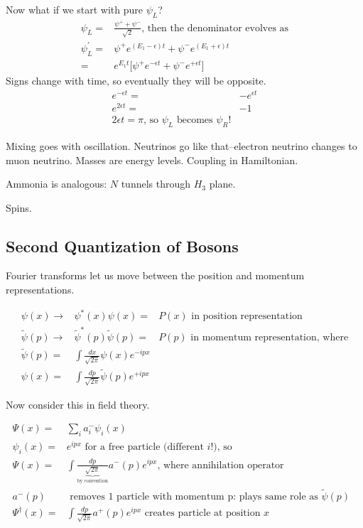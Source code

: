 \documentclass[]{article}
\begin{document}
Now what if we start with pure $\psi_L$?
\begin{align*}
	\psi_L =& \frac{\psi^+ + \psi^-}{\sqrt{2}}\text{, then the denominator evolves as}\\
	\psi_L^\prime =&\psi^+ e^{(E_1-\epsilon)t} + \psi^- e^{(E_1+\epsilon)t}\\
	=&e^{E_1 t}\big[\psi^+ e^{-\epsilon t} + \psi^- e^{+\epsilon t}\big]
\end{align*}
Signs change with time, so eventually they will be opposite.
\begin{align*}
e^{-\epsilon t} =& - e^{\epsilon t}\\
e^{2 \epsilon t}=&-1\\
2 \epsilon t = \pi \text{, so $\psi_L$ becomes $\psi_R$!}
\end{align*}

Mixing goes with oscillation. Neutrinos go like that--electron neutrino changes to muon neutrino. Masses are energy levels. Coupling in Hamiltonian.

Ammonia is analogous: $N$ tunnels through $H_3$ plane. 

Spins.



\subsection{Second Quantization of Bosons}

Fourier transforms let us move between the position and momentum representations.

\begin{align*}
\psi(x) \rightarrow& \psi^*(x)\psi(x)=&P(x) \text{ in position representation}\\
\widetilde{\psi}(p) \rightarrow& \widetilde{\psi}^*(p) \widetilde{\psi}(p) =&P(p) \text{ in momentum representation, where}\\
\widetilde{\psi}(p) =& \int \frac{dx}{\sqrt{2\pi}} \psi(x) e^{-i p x}\\
\psi(x) =& \int \frac{dp}{\sqrt{2\pi}} \widetilde{\psi}(p) e^{+i p x}
\end{align*}

Now consider this in field theory.

\begin{align*}
\Psi(x) =& \sum_{i} a^-_i \psi_i(x)\\
\psi_i(x) =& e^{ipx} \text{ for a free particle (different $i$!), so} \\
\Psi(x)=& \int \frac{dp}{\underbrace{\sqrt{2\pi}}_\text{by convention}} a^-(p) e^{ipx} \text{, where annihilation operator}\\
a^-(p)& \text{ removes 1 particle with momentum p: plays same role as $\widetilde{\psi}(p)$ }\\
\Psi^\dagger(x)=& \int \frac{dp}{\sqrt{2\pi}} a^+(p) e^{ipx} \text{ creates particle at position $x$}
\end{align*}
\end{document}
